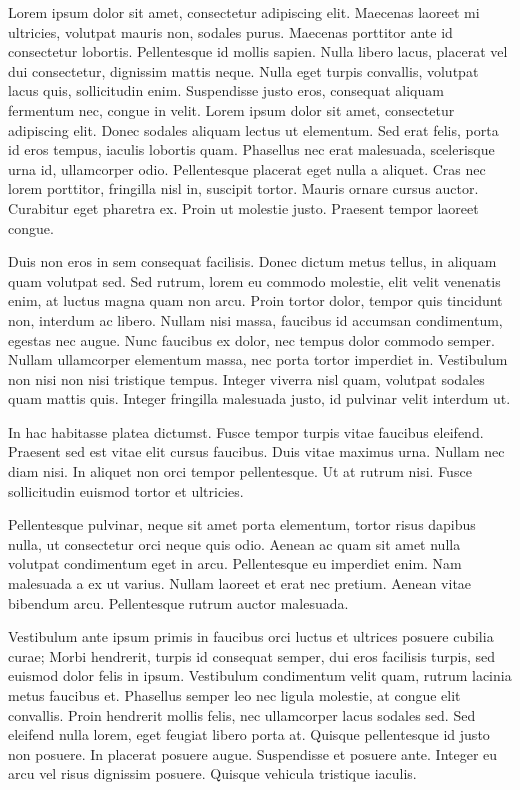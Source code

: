 Lorem ipsum dolor sit amet, consectetur adipiscing elit. Maecenas laoreet mi ultricies, volutpat mauris non, sodales purus. Maecenas porttitor ante id consectetur lobortis. Pellentesque id mollis sapien. Nulla libero lacus, placerat vel dui consectetur, dignissim mattis neque. Nulla eget turpis convallis, volutpat lacus quis, sollicitudin enim. Suspendisse justo eros, consequat aliquam fermentum nec, congue in velit. Lorem ipsum dolor sit amet, consectetur adipiscing elit. Donec sodales aliquam lectus ut elementum. Sed erat felis, porta id eros tempus, iaculis lobortis quam. Phasellus nec erat malesuada, scelerisque urna id, ullamcorper odio. Pellentesque placerat eget nulla a aliquet. Cras nec lorem porttitor, fringilla nisl in, suscipit tortor. Mauris ornare cursus auctor. Curabitur eget pharetra ex. Proin ut molestie justo. Praesent tempor laoreet congue.

Duis non eros in sem consequat facilisis. Donec dictum metus tellus, in aliquam quam volutpat sed. Sed rutrum, lorem eu commodo molestie, elit velit venenatis enim, at luctus magna quam non arcu. Proin tortor dolor, tempor quis tincidunt non, interdum ac libero. Nullam nisi massa, faucibus id accumsan condimentum, egestas nec augue. Nunc faucibus ex dolor, nec tempus dolor commodo semper. Nullam ullamcorper elementum massa, nec porta tortor imperdiet in. Vestibulum non nisi non nisi tristique tempus. Integer viverra nisl quam, volutpat sodales quam mattis quis. Integer fringilla malesuada justo, id pulvinar velit interdum ut.

In hac habitasse platea dictumst. Fusce tempor turpis vitae faucibus eleifend. Praesent sed est vitae elit cursus faucibus. Duis vitae maximus urna. Nullam nec diam nisi. In aliquet non orci tempor pellentesque. Ut at rutrum nisi. Fusce sollicitudin euismod tortor et ultricies.

Pellentesque pulvinar, neque sit amet porta elementum, tortor risus dapibus nulla, ut consectetur orci neque quis odio. Aenean ac quam sit amet nulla volutpat condimentum eget in arcu. Pellentesque eu imperdiet enim. Nam malesuada a ex ut varius. Nullam laoreet et erat nec pretium. Aenean vitae bibendum arcu. Pellentesque rutrum auctor malesuada.

Vestibulum ante ipsum primis in faucibus orci luctus et ultrices posuere cubilia curae; Morbi hendrerit, turpis id consequat semper, dui eros facilisis turpis, sed euismod dolor felis in ipsum. Vestibulum condimentum velit quam, rutrum lacinia metus faucibus et. Phasellus semper leo nec ligula molestie, at congue elit convallis. Proin hendrerit mollis felis, nec ullamcorper lacus sodales sed. Sed eleifend nulla lorem, eget feugiat libero porta at. Quisque pellentesque id justo non posuere. In placerat posuere augue. Suspendisse et posuere ante. Integer eu arcu vel risus dignissim posuere. Quisque vehicula tristique iaculis.
